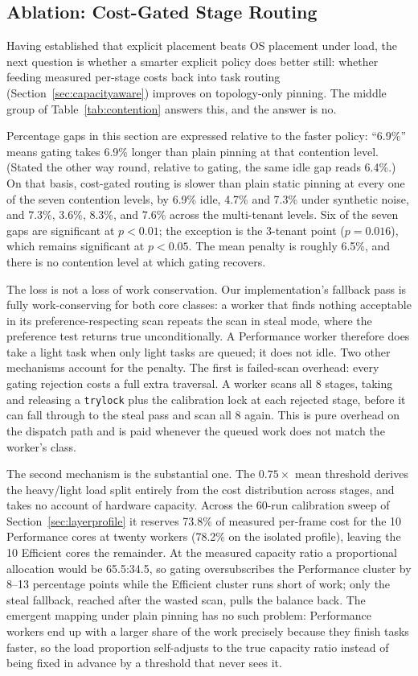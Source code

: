 \documentclass[conference]{IEEEtran}
\begin{document}
\subsection{Ablation: Cost-Gated Stage Routing}
\label{sec:ablation}
Having established that explicit placement beats OS placement under load, the next question is whether a smarter explicit policy does better still: whether feeding measured per-stage costs back into task routing (Section~\ref{sec:capacityaware}) improves on topology-only pinning. The middle group of Table~\ref{tab:contention} answers this, and the answer is no.

Percentage gaps in this section are expressed relative to the faster policy: ``6.9\%'' means gating takes 6.9\% longer than plain pinning at that contention level. (Stated the other way round, relative to gating, the same idle gap reads 6.4\%.) On that basis, cost-gated routing is slower than plain static pinning at every one of the seven contention levels, by 6.9\% idle, 4.7\% and 7.3\% under synthetic noise, and 7.3\%, 3.6\%, 8.3\%, and 7.6\% across the multi-tenant levels. Six of the seven gaps are significant at $p<0.01$; the exception is the 3-tenant point ($p=0.016$), which remains significant at $p<0.05$. The mean penalty is roughly 6.5\%, and there is no contention level at which gating recovers.

The loss is not a loss of work conservation. Our implementation's fallback pass is fully work-conserving for both core classes: a worker that finds nothing acceptable in its preference-respecting scan repeats the scan in steal mode, where the preference test returns true unconditionally. A Performance worker therefore does take a light task when only light tasks are queued; it does not idle. Two other mechanisms account for the penalty. The first is failed-scan overhead: every gating rejection costs a full extra traversal. A worker scans all 8 stages, taking and releasing a \texttt{trylock} plus the calibration lock at each rejected stage, before it can fall through to the steal pass and scan all 8 again. This is pure overhead on the dispatch path and is paid whenever the queued work does not match the worker's class.

The second mechanism is the substantial one. The $0.75\times$ mean threshold derives the heavy/light load split entirely from the cost distribution across stages, and takes no account of hardware capacity. Across the 60-run calibration sweep of Section~\ref{sec:layerprofile} it reserves 73.8\% of measured per-frame cost for the 10 Performance cores at twenty workers (78.2\% on the isolated profile), leaving the 10 Efficient cores the remainder. At the measured capacity ratio a proportional allocation would be 65.5:34.5, so gating oversubscribes the Performance cluster by 8--13 percentage points while the Efficient cluster runs short of work; only the steal fallback, reached after the wasted scan, pulls the balance back. The emergent mapping under plain pinning has no such problem: Performance workers end up with a larger share of the work precisely because they finish tasks faster, so the load proportion self-adjusts to the true capacity ratio instead of being fixed in advance by a threshold that never sees it.
\end{document}
